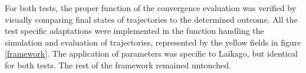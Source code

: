     For both tests, the proper function of the convergence evaluation was verified by visually comparing final states of trajectories to the determined outcome. All the test specific adaptations were implemented in the function handling the simulation and evaluation of trajectories, represented by the yellow fields in figure \ref{framework}. The application of parameters was specific to Laikago, but identical for both tests. The rest of the framework remained untouched.


